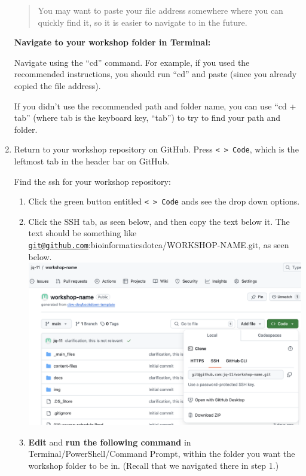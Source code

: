 \documentclass[
]{book}
\newenvironment{bluebox}{
  \definecolor{shadecolor}{RGB}{172, 210, 237}
  \color{white}
  \begin{shaded}}
 {\end{shaded}}
\newenvironment{greenbox}{
  \definecolor{shadecolor}{RGB}{141, 181, 128}
  \color{white}
  \begin{shaded}}
 {\end{shaded}}
\theoremstyle{definition}
\theoremstyle{definition}
\theoremstyle{definition}
\theoremstyle{definition}
\theoremstyle{remark}
\begin{document}
\begin{enumerate}
\begin{bluebox}
  \begin{quote}
  You may want to paste your file address somewhere where you can quickly find it, so it is easier to navigate to in the future.
  \end{quote}

  \end{bluebox}

  \begin{greenbox}

  \begin{center}
  \textbf{Navigate to your workshop folder in Terminal:}

  \end{center}

  Navigate using the ``cd'' command. For example, if you used the recommended instructions, you should run ``cd'' and paste (since you already copied the file address).

  If you didn't use the recommended path and folder name, you can use ``cd + tab'' (where tab is the keyboard key, ``tab'') to try to find your path and folder.

  \end{greenbox}
\item
  Return to your workshop repository on GitHub. Press \texttt{\textless{}\ \textgreater{}\ Code}, which is the leftmost tab in the header bar on GitHub.

  Find the ssh for your workshop repository:

  \begin{enumerate}
  \def\labelenumii{\alph{enumii})}
  \item
    Click the green button entitled \texttt{\textless{}\ \textgreater{}\ Code} ands see the drop down options.
  \item
    Click the SSH tab, as seen below, and then copy the text below it. The text should be something like \href{mailto:git@github.com}{\nolinkurl{git@github.com}}:bioinformaticsdotca/WORKSHOP-NAME.git, as seen below.
    \includegraphics{img/git-instruct/copy-ssh.png}\\
  \item
    \textbf{Edit} and \textbf{run the following command} in Terminal/PowerShell/Command Prompt, within the folder you want the workshop folder to be in. (Recall that we navigated there in step 1.)
  \end{enumerate}


\end{enumerate}
\end{document}

